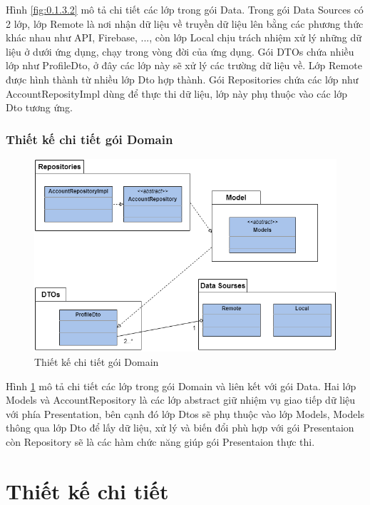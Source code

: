 \documentclass[../DoAn.tex]{subfiles}
\begin{document}
Hình \ref{fig:0.1.3.2} mô tả chi tiết các lớp trong gói Data. Trong gói Data Sources có 2 lớp, lớp Remote là nơi nhận dữ liệu về truyền dữ liệu lên bằng các phương thức khác nhau như API, Firebase\cite{Firebase}, ..., còn lớp Local chịu trách nhiệm xử lý những dữ liệu ở dưới ứng dụng, chạy trong vòng đời của ứng dụng. Gói DTOs chứa nhiều lớp như ProfileDto, ở đây các lớp này sẽ xử lý các trường dữ liệu về. Lớp Remote được hình thành từ nhiều lớp Dto hợp thành. Gói Repositories chứa các lớp như AccountReposityImpl dùng để thực thi dữ liệu, lớp này phụ thuộc vào các lớp Dto tương ứng.

\subsubsection{Thiết kế chi tiết gói Domain}

\begin{figure}[H]
    \centering
    \includegraphics[scale = 0.6]{Hinhve/package_data_domain.png}
    \caption{Thiết kế chi tiết gói Domain}
    \label{fig:0.1.3.3}
\end{figure}

Hình \ref{fig:0.1.3.3} mô tả chi tiết các lớp trong gói Domain và liên kết với gói Data. Hai lớp Models và AccountRepository là các lớp abstract giữ nhiệm vụ giao tiếp dữ liệu với phía Presentation, bên cạnh đó lớp Dtos sẽ phụ thuộc vào 
lớp Models, Models thông qua lớp Dto để lấy dữ liệu, xử lý và biến đổi phù hợp với gói Presentaion còn Repository sẽ là các hàm chức năng giúp gói Presentaion thực thi.

\section{Thiết kế chi tiết}
\end{document}
